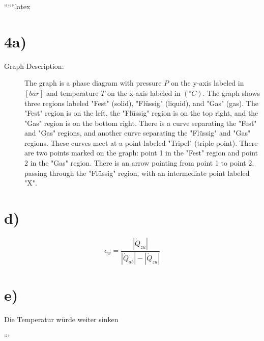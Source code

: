 
``````latex


\section*{4a)}

\begin{description}
    \item[Graph Description:] The graph is a phase diagram with pressure \( P \) on the y-axis labeled in \([bar]\) and temperature \( T \) on the x-axis labeled in \((^\circ C)\). The graph shows three regions labeled "Fest" (solid), "Flüssig" (liquid), and "Gas" (gas). The "Fest" region is on the left, the "Flüssig" region is on the top right, and the "Gas" region is on the bottom right. There is a curve separating the "Fest" and "Gas" regions, and another curve separating the "Flüssig" and "Gas" regions. These curves meet at a point labeled "Tripel" (triple point). There are two points marked on the graph: point 1 in the "Fest" region and point 2 in the "Gas" region. There is an arrow pointing from point 1 to point 2, passing through the "Flüssig" region, with an intermediate point labeled "X".
\end{description}

\section*{d)}

\[
\epsilon_w = \frac{\left| \dot{Q}_{zu} \right|}{\left| \dot{Q}_{ab} \right| - \left| \dot{Q}_{zu} \right|}
\]

\section*{e)}

Die Temperatur würde weiter sinken

```